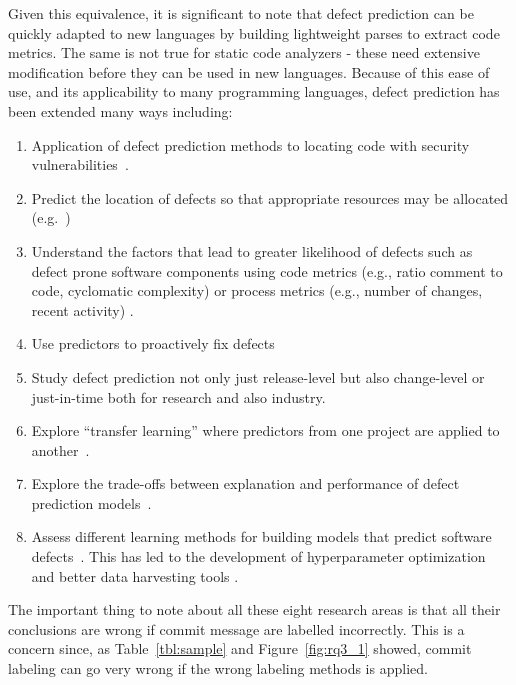 \documentclass[10pt,journal,compsoc]{IEEEtran}
\newcommand{\be}{\begin{enumerate}[leftmargin=0.4cm]}
\newcommand{\ee}{\end{enumerate}}
\newcommand{\fig}[1]{Figure~\ref{fig:#1}}
\newcommand{\tbl}[1]{Table~\ref{tbl:#1}}
\begin{document}
Given this equivalence, it is significant to
note that  defect prediction can be quickly adapted to new languages by building lightweight parses to extract  code metrics. The same is not true for static code analyzers - these need extensive modification before they can be used in new languages.
Because of this ease of use,  and its applicability to many programming languages, defect prediction has been   extended  many ways including:
\be
\item Application of defect prediction methods to locating code with security vulnerabilities~\cite{Shin2013}.
    \item Predict the location of defects so that appropriate resources may be allocated (e.g.~\cite{bird09reliabity})
    \item Understand the factors that lead to greater likelihood of defects such as defect prone software components using code metrics (e.g., ratio comment to code, cyclomatic complexity) \cite{menzies10dp, menzies07dp, ambros10extensive} or process metrics (e.g., number of changes, recent activity) \cite{nagappan05codechurn,elbaum00codechurn, moser08changemetrics, hassan09codechanges}. 
    \item Use   predictors to proactively fix  defects~\cite{kamei16_lit, legoues12_aprlit, arcuri2011practical}
    \item Study defect prediction not only just release-level \cite{di18_fft, agrawal2018better} but also change-level or just-in-time \cite{yan18_tddetermination, kamei12_jit, nayrolles18_clever, commitguru} both for research and also industry.  
    \item Explore ``transfer learning'' where predictors from one project are applied to another~\cite{krishnaTSE18,nam18tse}.
    \item Explore the  trade-offs between 
    explanation and performance of defect prediction models~\cite{di18_fft}.
    \item Assess   different learning methods for building models that predict software defects~\cite{ghotra15}. This has led to the development of hyperparameter optimization and better data harvesting tools \cite{agrawal2018wrong, agrawal2018better, Fu17easy, Fu16Grid, Fu2016TuningFS,tantithamthavorn2016automated}. 
\ee
 The important thing to note about all these eight research areas is that  all their conclusions are wrong if commit
 message are labelled incorrectly.
 This is a concern since,  as  \tbl{sample} and \fig{rq3_1}
 showed, commit labeling
 can go very wrong if the wrong labeling methods is applied.
 
\end{document}

